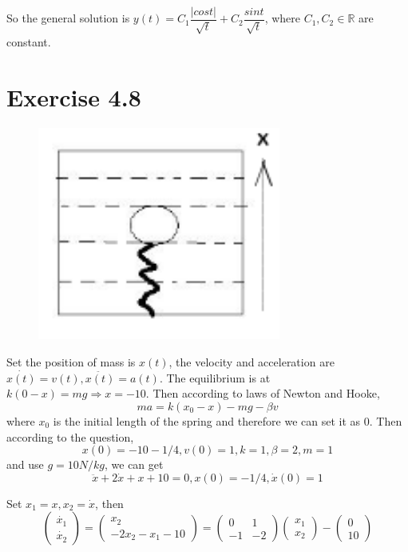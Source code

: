 \documentclass[a4paper,12pt,titlepage]{article}
\begin{document}
So the general solution is $y(t)=C_1\dfrac{|cost|}{\sqrt{t}}+C_2\dfrac{sint}{\sqrt{t}} $, where $C_1,C_2\in\mathbb{R}$ are constant.

\section*{Exercise 4.8}
\begin{figure}[H]
    \centering
    \includegraphics[width=8cm]{8.png}
\end{figure}

Set the position of mass is $x(t)$, the velocity and acceleration are $\dot{x(t)}=v(t),\ddot{x(t)}=a(t)$. The equilibrium is at $k(0-x)=mg\Rightarrow x=-10$. Then according to laws of Newton and Hooke, 
$$ma=k(x_0-x)-mg-\beta v$$
where $x_0$ is the initial length of the spring and therefore we can set it as 0. Then according to the question, 
$$x(0)=-10-1/4,v(0)=1,k=1,\beta=2,m=1$$
and use $g=10N/kg$, we can get
$$\ddot{x}+2\dot{x}+x+10=0,x(0)=-1/4,\dot{x}(0)=1$$

Set $x_1=x,x_2=\dot{x}$, then
$$\begin{pmatrix}
\dot{x_1}\\
\dot{x_2}
\end{pmatrix}=\begin{pmatrix}
x_2\\
-2x_2-x_1-10
\end{pmatrix}=\begin{pmatrix}
0&1\\
-1&-2
\end{pmatrix}\begin{pmatrix}
x_1\\
x_2
\end{pmatrix}-\begin{pmatrix}
0\\
10
\end{pmatrix}
$$
\end{document}
